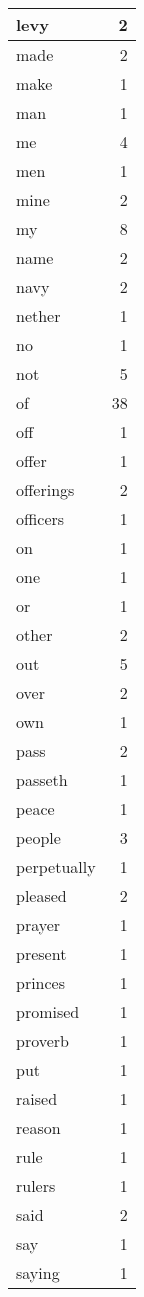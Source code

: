 \begin{center}
\begin{longtable}{l|r}
levy & 2 \\ \hline
made & 2 \\ \hline
make & 1 \\ \hline
man & 1 \\ \hline
me & 4 \\ \hline
men & 1 \\ \hline
mine & 2 \\ \hline
my & 8 \\ \hline
name & 2 \\ \hline
navy & 2 \\ \hline
nether & 1 \\ \hline
no & 1 \\ \hline
not & 5 \\ \hline
of & 38 \\ \hline
off & 1 \\ \hline
offer & 1 \\ \hline
offerings & 2 \\ \hline
officers & 1 \\ \hline
on & 1 \\ \hline
one & 1 \\ \hline
or & 1 \\ \hline
other & 2 \\ \hline
out & 5 \\ \hline
over & 2 \\ \hline
own & 1 \\ \hline
pass & 2 \\ \hline
passeth & 1 \\ \hline
peace & 1 \\ \hline
people & 3 \\ \hline
perpetually & 1 \\ \hline
pleased & 2 \\ \hline
prayer & 1 \\ \hline
present & 1 \\ \hline
princes & 1 \\ \hline
promised & 1 \\ \hline
proverb & 1 \\ \hline
put & 1 \\ \hline
raised & 1 \\ \hline
reason & 1 \\ \hline
rule & 1 \\ \hline
rulers & 1 \\ \hline
said & 2 \\ \hline
say & 1 \\ \hline
saying & 1 \\ \hline

\end{longtable}
\end{center}
